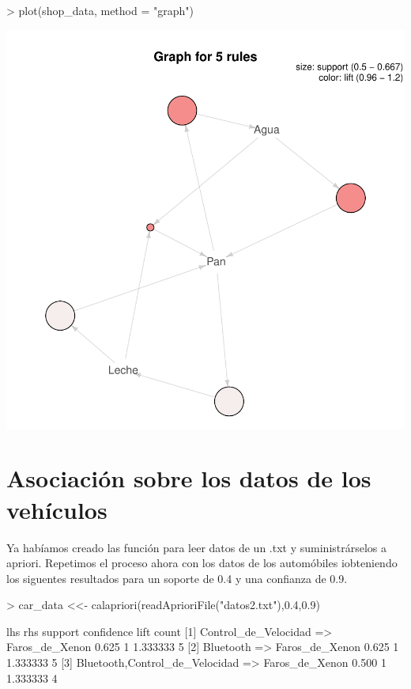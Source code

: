 \documentclass [a4paper] {article}
\begin{document}
\begin{center}
\begin{Schunk}
\begin{Sinput}
> plot(shop_data, method = "graph")
\end{Sinput}
\end{Schunk}
\includegraphics{entrega-grafica_apriori_shop_graph}
\end{center}

\section{Asociación sobre los datos de los vehículos}
Ya habíamos creado las función para leer datos de un .txt y suministrárselos a apriori.
Repetimos el proceso ahora con los datos de los automóbiles iobteniendo los siguentes resultados para un soporte de 0.4 y una confianza de 0.9.


\begin{Schunk}
\begin{Sinput}
> car_data <<- calapriori(readAprioriFile("datos2.txt"),0.4,0.9)
\end{Sinput}
\begin{Soutput}
    lhs                                 rhs              support confidence lift     count
[1] {Control_de_Velocidad}           => {Faros_de_Xenon} 0.625   1          1.333333 5    
[2] {Bluetooth}                      => {Faros_de_Xenon} 0.625   1          1.333333 5    
[3] {Bluetooth,Control_de_Velocidad} => {Faros_de_Xenon} 0.500   1          1.333333 4    
\end{Soutput}
\end{Schunk}
\end{document}
